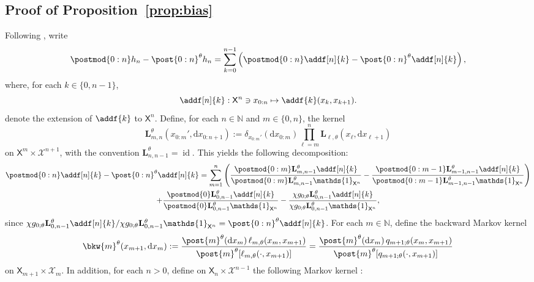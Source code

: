 \documentclass{article}
\newcommand{\Xfd}{\mathcal{X}}
\newcommand{\uksymbol}{\ell}
\newcommand{\intvect}[2]{\{ #1, #2 \}}
\newcommand{\ud}[1]{\uksymbol_{#1}}
\newcommand{\nset}{\mathbb{N}}
\newcommand{\1}{\mathbbm{1}}
\newcommand{\uk}[1]{\mathbf{L}_{#1}}
\newcommand{\Xset}{\mathsf{X}}
\newcommand{\md}[1]{g_{#1}}
\newcommand{\parvec}{\theta}
\newcommand{\hd}[1]{q_{#1}}
\def\1{\mathds{1}}
\newcommand{\rmd}{\ensuremath{\mathrm{d}}}
\newcommand{\eqdef}{\ensuremath{:=}}
\begin{document}
\subsection{Proof of Proposition~\ref{prop:bias}}
\label{sec:proof}
Following \cite{gloaguen2019pseudo}, write 
$$
\postmod{0:n} h_n - \post{0:n}^\theta h_n = \sum_{k = 0}^{n - 1} \left( \postmod{0:n} \addf[n]{k} - \post{0:n}^\theta \addf[n]{k} \right), 
$$
where, for each $k \in \intvect{0}{n - 1}$, 
\begin{equation} \label{eq:def:addf}
\addf[n]{k} : \Xset^n \ni x_{0:n} \mapsto \addf{k}(x_k, x_{k + 1}) .
\end{equation}
denote the extension of $\addf{k}$ to $\Xset^n$. Define, for each $n \in \nset$ and $m \in \intvect{0}{n}$, the kernel 
\begin{equation} \label{eq:def:uk:products}
    \uk{m, n}^\theta(x_{0:m}', \rmd x_{0:n + 1}) \eqdef \delta_{x_{0:m}'}(\rmd x_{0:m}) \prod_{\ell = m}^n \uk{\ell,\theta}(x_\ell, \rmd x_{\ell + 1}) 
\end{equation}
on $\Xset^m \times \Xfd^{n + 1}$, with the convention $\uk{n, n - 1}^\theta = \operatorname{id}$.  This yields the following decomposition:
\begin{multline*}
\postmod{0:n} \addf[n]{k} - \post{0:n}^\theta \addf[n]{k} = 
\sum_{m = 1}^n \left( \frac{\postmod{0:m} \uk{m, n - 1}^\theta \addf[n]{k}}{\postmod{0:m} \uk{m, n - 1}^\theta \1_{\Xset^n}} - \frac{\postmod{0:m - 1} \uk{m - 1, n - 1}^\theta \addf[n]{k}}{\postmod{0:m - 1} \uk{m - 1, n - 1}^\theta \1_{\Xset^n}} \right) \\ + \frac{\postmod{0} \uk{0, n - 1}^\theta \addf[n]{k}}{\postmod{0} \uk{0, n - 1}^\theta \1_{\Xset^n}} - \frac{\chi \md{0;\parvec}\uk{0, n - 1}^\theta \addf[n]{k}}{\chi\md{0;\parvec}\uk{0, n - 1}^\theta \1_{\Xset^n}},
\end{multline*}
since $\chi \md{0;\parvec} \uk{0, n - 1}^\theta \addf[n]{k}/\chi\md{0;\parvec}\uk{0, n - 1}^\theta \1_{\Xset^n} = \post{0:n}^\theta \addf[n]{k}$.
For each $m \in \nset$, define the  backward Markov kernel 
\begin{equation} \label{eq:def:backward:kernel}
    \bkw{m}^\parvec(x_{m + 1}, \rmd x_m) \eqdef \frac{\post{m}^\parvec(\rmd x_m) \, \ud{m,\parvec}(x_m, x_{m + 1})}{\post{m}^\parvec[\ud{m,\parvec}(\cdot, x_{m + 1})]} = \frac{\post{m}^\parvec(\rmd x_m) \, \hd{m+1;\parvec}(x_{m}, x_{m+1})}{\post{m}^\parvec[\hd{m+1;\parvec}(\cdot, x_{m+1})]}
\end{equation}
on $\Xset_{m + 1} \times \Xfd_m$. In addition, for each $n>0$, define on $\Xset_n \times \Xfd^{n - 1}$ the following Markov kernel  : 
\end{document}
